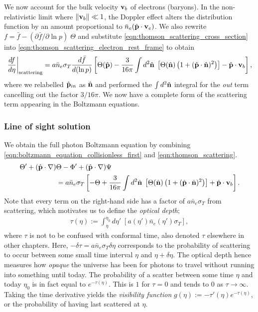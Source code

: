 We now account for the bulk velocity $\mathbf{v}_b$ of electrons (baryons). In the non-relativistic limit where $\|\mathbf{v}_b \| \ll 1$, the Doppler effect alters the distribution function by an amount proportional to $\bar{n}_e (\hat{\mathbf{p}} \cdot \mathbf{v}_e)$. We also rewrite $f = \bar{f} - (\partial\bar{f}/\partial\ln p) \; \Theta$ and substitute \eqref{eqn:thomson_scattering_cross_section} into \eqref{eqn:thomson_scattering_electron_rest_frame} to obtain
\begin{align}
	\left. \frac{df}{d\eta} \right|_\text{scattering} = a \bar{n}_e \sigma_T \frac{d\bar{f}}{d(\ln p)}  \left[ \Theta(\hat{\mathbf{p}}) - \frac{3}{16\pi} \int d^2 \hat{\mathbf{n}} \; \left[ \Theta(\hat{\mathbf{n}}) \left( 1 + (\hat{\mathbf{p}} \cdot \hat{\mathbf{n}})^2 \right) \right] - \hat{\mathbf{p}} \cdot \mathbf{v}_b \right], \label{eqn:thomson_scattering}
\end{align}
where we relabelled $\hat{\mathbf{p}}_{in}$ as $\hat{\mathbf{n}}$ and performed the $\int d^2\hat{\mathbf{n}}$ integral for the \textit{out} term cancelling out the factor $3/16\pi$. We now have a complete form of the scattering term appearing in the Boltzmann equations.


\subsubsection*{Line of sight solution} \label{section:line_of_sight_solution}

We obtain the full photon Boltzmann equation by combining \eqref{eqn:boltzmann_equation_collisionless_first} and \eqref{eqn:thomson_scattering}.
\begin{align}
	\Theta' + (\hat{\mathbf{p}} \cdot \nabla) &\Theta - \Phi' +(\hat{\mathbf{p}} \cdot \nabla) \Psi  \nonumber \\	
	&= a \bar{n}_e \sigma_T \left[ -\Theta + \frac{3}{16\pi} \int d^2 \hat{\mathbf{n}} \; \left[ \Theta(\hat{\mathbf{n}}) \left( 1 + (\hat{\mathbf{p}} \cdot \hat{\mathbf{n}})^2 \right) \right] + \hat{\mathbf{p}} \cdot \mathbf{v}_b \right]. \label{eqn:boltzmann_equation_1}
\end{align}
Note that every term on the right-hand side has a factor of $a\bar{n}_e \sigma_T$ from scattering, which motivates us to define the \textit{optical depth};
\begin{align}
	\tau(\eta) := \int_\eta^{\eta_0} d\eta'\; \left[ a(\eta') \bar{n}_e (\eta') \sigma_T \right],
\end{align}
where $\tau$ is not to be confused with conformal time, also denoted $\tau$ elsewhere in other chapters. Here, $-\delta\tau = a\bar{n}_e \sigma_T \delta\eta$ corresponds to the probability of scattering to occur between some small time interval $\eta$ and $\eta+\delta\eta$. The optical depth hence measures how \textit{opaque} the universe has been for photons to travel without running into something until today. The probability of a scatter between some time $\eta$ and today $\eta_0$ is in fact equal to $e^{-\tau(\eta)}$. This is $1$ for $\tau=0$ and tends to $0$ as $\tau\rightarrow\infty$. Taking the time derivative yields the \textit{visibility function} $g(\eta):=-\tau'(\eta) e^{-\tau(\eta)}$, or the probability of having last scattered at $\eta$.

